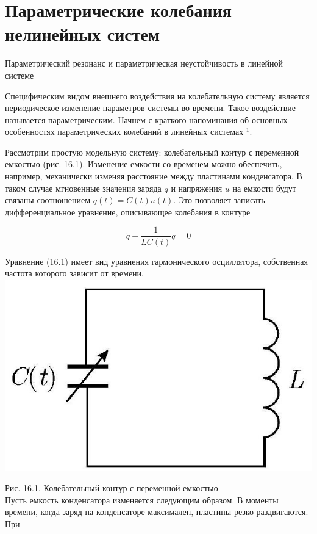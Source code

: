\documentclass[10pt]{article}
\begin{document}
\section*{Параметрические колебания нелинейных систем}
Параметрический резонанс и параметрическая неустойчивость в линейной системе

Специфическим видом внешнего воздействия на колебательную систему является периодическое изменение параметров системы во времени. Такое воздействие называется параметрическим. Начнем с краткого напоминания об основных особенностях параметрических колебаний в линейных системах ${ }^{1}$.

Рассмотрим простую модельную систему: колебательный контур с переменной емкостью (рис. 16.1). Изменение емкости со временем можно обеспечить, например, механически изменяя расстояние между пластинами конденсатора. В таком случае мгновенные значения заряда $q$ и напряжения $u$ на емкости будут связаны соотношением $q(t)=C(t) u(t)$. Это позволяет записать дифференциальное уравнение, описывающее колебания в контуре


\begin{equation*}
\ddot{q}+\frac{1}{L C(t)} q=0 \tag{16.1}
\end{equation*}


Уравнение (16.1) имеет вид уравнения гармонического осциллятора, собственная частота которого зависит от времени.\\
\includegraphics[max width=\textwidth, center]{2024_12_13_864dea76193ac5d12698g-258}

Рис. 16.1. Колебательный контур с переменной емкостью\\
Пусть емкость конденсатора изменяется следующим образом. В моменты времени, когда заряд на конденсаторе максимален, пластины резко раздвигаются. При
\end{document}
